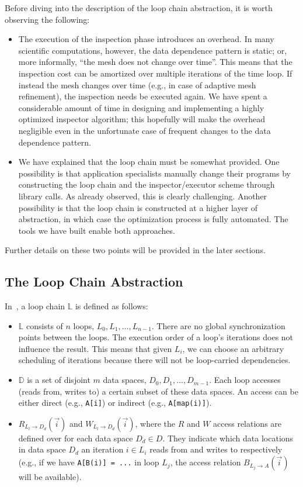 Before diving into the description of the loop chain abstraction, it is worth observing the following:
\begin{itemize}
\item The execution of the inspection phase introduces an overhead. In many scientific computations, however, the data dependence pattern is static; or, more informally, ``the mesh does not change over time''. This means that the inspection cost can be amortized over multiple iterations of the time loop. If instead the mesh changes over time (e.g., in case of adaptive mesh refinement), the inspection needs be executed again. We have spent a considerable amount of time in designing and implementing a highly optimized inspector algorithm; this hopefully will make the overhead negligible even in the unfortunate case of frequent changes to the data dependence pattern. 
\item We have explained that the loop chain must be somewhat provided. One possibility is that application specialists manually change their programs by constructing the loop chain and the inspector/executor scheme through library calls. As already observed, this is clearly challenging. Another possibility is that the loop chain is constructed at a higher layer of abstraction, in which case the optimization process is fully automated. The tools we have built enable both approaches.
\end{itemize}
Further details on these two points will be provided in the later sections. 

\subsection{The Loop Chain Abstraction}
In~\cite{ST-KriegerHIPS2013}, a loop chain $\mathbb{L}$ is defined as follows:
\begin{itemize}
\item $\mathbb{L}$ consists of $n$ loops, $L_0, L_1, ..., L_{n-1}$. There are no global synchronization points between the loops. The execution order of a loop's iterations does not influence the result. This means that given $L_i$, we can choose an arbitrary scheduling of iterations because there will not be loop-carried dependencies. 
\item $\mathbb{D}$ is a set of disjoint $m$ data spaces, $D_0, D_1, ..., D_{m-1}$. Each loop accesses (reads from, writes to) a certain subset of these data spaces. An access can be either direct (e.g., \texttt{A[i]}) or indirect (e.g., \texttt{A[map(i)]}).
\item $R_{L_l\rightarrow D_d}(\vec{i})$ and $W_{L_l\rightarrow D_d}(\vec{i})$, where the $R$ and $W$ access relations are defined over for each data space $D_d \in D$. They indicate which data locations in data space $D_d$ an iteration $i \in L_i$ reads from and writes to respectively (e.g., if we have \texttt{A[B(i)] = ...} in loop $L_j$, the access relation $B_{L_j\rightarrow A}(\vec{i})$ will be available). 
\end{itemize}

